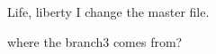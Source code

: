 \documentclass{article}
\begin{document}
Life, liberty
I change the master file.

where the branch3 comes from?
\end{document}
